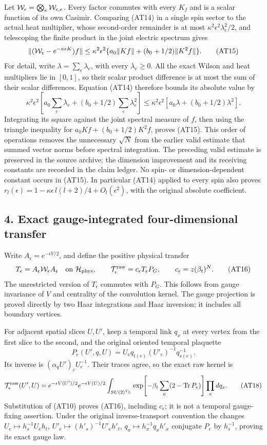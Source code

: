 \documentclass[11pt]{article}
\begin{document}
Let \({\cal W}_\epsilon=\bigotimes_e{\cal W}_{\epsilon,e}\). Every factor commutes with every \(K_f\) and is a scalar function of its own Casimir. Comparing (AT14) in a single spin sector to the actual heat multiplier, whose second-order remainder is at most \(\kappa^2\epsilon^2\lambda_e^2/2\), and telescoping the finite product in the joint electric spectrum gives
\[
 \|({\cal W}_\epsilon-e^{-\kappa\epsilon K})f\|
 \le\kappa^2\epsilon^2
       \{a_0\|Kf\|+(b_0+1/2)\|K^2f\|\}.
 \tag{AT15}
\]
For detail, write \(\lambda=\sum_e\lambda_e\), with every \(\lambda_e\ge0\).
All the exact Wilson and heat multipliers lie in \([0,1]\), so their scalar product difference is at most the sum of their scalar differences. Equation (AT14) therefore bounds its absolute value by
\[
 \kappa^2\epsilon^2
   \left[a_0\sum_e\lambda_e+(b_0+1/2)\sum_e\lambda_e^2\right]
 \le\kappa^2\epsilon^2[a_0\lambda+(b_0+1/2)\lambda^2].
\]
Integrating its square against the joint spectral measure of \(f\), then using the triangle inequality for \(a_0Kf+(b_0+1/2)K^2f\), proves (AT15). This order of operations removes the unnecessary \(\sqrt N\) from the earlier valid estimate that summed vector norms before spectral integration. The preceding valid estimate is preserved in the source archive; the dimension improvement and its receiving constants are recorded in the claim ledger. No spin- or dimension-dependent constant occurs in (AT15). In particular (AT14) applied to every spin also proves
\(r_l(\epsilon)=1-\kappa\epsilon\,l(l+2)/4+O_l(\epsilon^2)\), with the original absolute coefficient.

\subsection*{4. Exact gauge-integrated four-dimensional transfer}

Write \(A_\epsilon=e^{-\epsilon V/2}\), and define the positive physical transfer
\[
 T_\epsilon=A_\epsilon{\cal W}_\epsilon A_\epsilon
       \quad\hbox{on }{\cal H}_{\rm phys},\qquad
 {\cal T}^{\rm raw}_\epsilon
       =c_\epsilon T_\epsilon P_G,\qquad
 c_\epsilon=z(\beta_t)^N .
 \tag{AT16}
\]
The unrestricted version of \(T_\epsilon\) commutes with \(P_G\). This follows from gauge invariance of \(V\) and centrality of the convolution kernel. The gauge projection is proved directly by two Haar integrations and Haar inversion; it includes all boundary vertices.

For adjacent spatial slices \(U,U'\), keep a temporal link \(q_x\) at every vertex from the first slice to the second, and the original oriented temporal plaquette
\[
 P_e(U',q,U)=U_eq_{t(e)}(U'_e)^{-1}q_{s(e)}^{-1}.
 \tag{AT17}
\]
Its inverse is
\((\alpha_qU')_eU_e^{-1}\). Their traces agree, so the exact raw kernel is
\[
 {\cal T}^{\rm raw}_\epsilon(U',U)
 =e^{-\epsilon V(U')/2}e^{-\epsilon V(U)/2}
   \int_{SU(2)^{V_L}}
      \exp\!\left[-\beta_t\sum_e(2-\operatorname{Tr}P_e)\right]
          \prod_xdq_x .
 \tag{AT18}
\]
Substitution of (AT10) proves (AT16), including \(c_\epsilon\); it is not a temporal gauge-fixing assertion. Under the original inverse-transport convention the changes
\(U_e\mapsto h_s^{-1}U_eh_t\),
\(U'_e\mapsto(h'_s)^{-1}U'_eh'_t\),
\(q_x\mapsto h_x^{-1}q_xh'_x\)
conjugate \(P_e\) by \(h_s^{-1}\), proving its exact gauge law.
\end{document}
